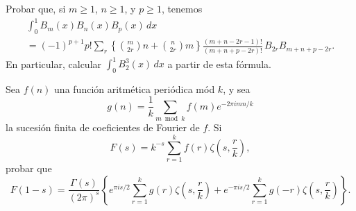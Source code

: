 \documentclass[12pt,a4paper]{book}
\begin{document}
    \begin{ejercicio}
        Probar que, si $m\geq1$, $n\geq1$, y $p\geq1$, tenemos
        \begin{multline*}
            \int_{0}^{1}B_{m}(x)B_{n}(x)B_{p}(x)\,dx\\
            =(-1)^{p+1}p!\sum_{r}\left\{\binom{m}{2r}n+\binom{n}{2r}m\right\}\frac{(m+n-2r-1)!}{(m+n+p-2r)!}\,B_{2r}B_{m+n+p-2r}.
        \end{multline*}
        En particular, calcular $\int_{0}^{1}B_{2}^{3}(x)\,dx$ a partir de esta fórmula.
    \end{ejercicio}

    \begin{ejercicio}
        Sea $f(n)$ una función aritmética periódica mód $k$, y sea
        \begin{equation*}
            g(n)=\frac{1}{k}\sum_{m\bmod k}f(m)e^{-2\pi imn/k}
        \end{equation*}
        la sucesión finita de coeficientes de Fourier de $f$. Si
        \begin{equation*}
            F(s)=k^{-s}\sum_{r=1}^{k}f(r)\zeta\left(s,\frac{r}{k}\right),
        \end{equation*}
        probar que
        \begin{equation*}
            F(1-s)=\frac{\Gamma(s)}{(2\pi)^{s}}\left\{e^{\pi is/2}\sum_{r=1}^{k}g(r)\zeta\left(s,\frac{r}{k}\right)+e^{-\pi is/2}\sum_{r=1}^{k}g(-r)\zeta\left(s,\frac{r}{k}\right)\right\}.
        \end{equation*}
    \end{ejercicio}
\end{document}
